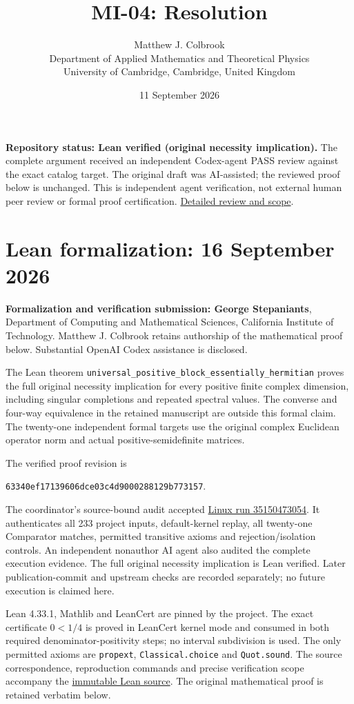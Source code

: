 \documentclass[10pt,a4paper]{article}
\title{MI-04: Resolution}
\author{Matthew J. Colbrook\\
\small Department of Applied Mathematics and Theoretical Physics\\
\small University of Cambridge, Cambridge, United Kingdom\\
}
\date{11 September 2026}
\theoremstyle{remark}
\begin{document}
\maketitle
\textbf{Repository status: Lean verified (original necessity implication).}
The complete argument received an independent Codex-agent PASS review
against the exact catalog target.
The original draft was AI-assisted; the reviewed proof below is unchanged.
This is independent agent verification, not external human peer review or
formal proof certification. \href{https://github.com/ajt60gaibb/OpenProblemsInNLA/blob/main/references/colbrook-matrix-2026-09-11/verification/reviews/MI-04-review.md}{Detailed review and scope}.
\par\medskip
\section*{Lean formalization: 16 September 2026}
\textbf{Formalization and verification submission: George Stepaniants},
Department of Computing and Mathematical Sciences, California Institute of Technology.
Matthew J. Colbrook retains authorship of the mathematical proof below.
Substantial OpenAI Codex assistance is disclosed.

The Lean theorem \texttt{universal\_positive\_block\_essentially\_hermitian}
proves the full original necessity implication for every positive finite complex
dimension, including singular completions and repeated spectral values.
The converse and four-way equivalence in the retained manuscript are outside
this formal claim. The twenty-one independent formal targets use the original
complex Euclidean operator norm and actual positive-semidefinite matrices.

The verified proof revision is
\begin{center}\small\texttt{63340ef17139606dce03c4d9000288129b773157}.\end{center}
The coordinator's source-bound audit accepted
\href{https://github.com/sgstepaniants/OpenProblemsInNLA/actions/runs/35150473054}{Linux run 35150473054}.
It authenticates all 233 project inputs, default-kernel replay, all twenty-one
Comparator matches, permitted transitive axioms and rejection/isolation controls.
An independent nonauthor AI agent also audited the complete execution evidence.
The full original necessity implication is Lean verified. Later publication-commit
and upstream checks are recorded separately; no future execution is claimed here.

Lean 4.33.1, Mathlib and LeanCert are pinned by the project. The exact certificate
$0<1/4$ is proved in LeanCert kernel mode and consumed in both required
denominator-positivity steps; no interval subdivision is used.
The only permitted axioms are \texttt{propext}, \texttt{Classical.choice} and
\texttt{Quot.sound}. The source correspondence, reproduction commands and
precise verification scope accompany the
\href{https://github.com/sgstepaniants/OpenProblemsInNLA/blob/63340ef17139606dce03c4d9000288129b773157/matrix-inequalities-and-norms/MI-04/lean/Solution.lean}{immutable Lean source}.
The original mathematical proof is retained verbatim below.
\par\medskip
\end{document}
